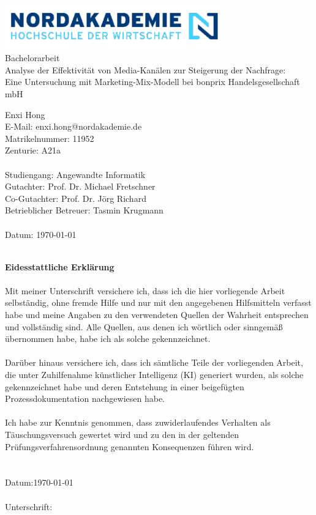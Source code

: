 \documentclass{common/nak}
\numberwithin{equation}{subsection}
\begin{document}
\hspace{3cm}
\begin{center}
    \includegraphics[width=0.7\textwidth]{images/nak_logo2.png}\\
     \huge { Bachelorarbeit \\[1em]
     \large{Analyse der Effektivität von Media-Kanälen zur Steigerung der Nachfrage:
     \\ Eine Untersuchung mit Marketing-Mix-Modell bei bonprix Handelsgesellschaft mbH
}}
\end{center}

\vspace*{\fill}


\noindent 
Enxi Hong \\
E-Mail: enxi.hong@nordakademie.de\\
Matrikelnummer: 11952\\
Zenturie: A21a\\\\
Studiengang: Angewandte Informatik\\
Gutachter: Prof. Dr. Michael Fretschner\\
Co-Gutachter: Prof. Dr. Jörg Richard\\
Betrieblicher Betreuer: Tasmin Krugmann\\\\
Datum: \today

\newpage

\newpage
\hspace{2cm}\\
\textbf{\Large Eidesstattliche Erklärung}\\\\
Mit meiner Unterschrift versichere ich, dass ich die hier vorliegende Arbeit 
selbständig, ohne fremde Hilfe und nur mit den angegebenen Hilfsmitteln verfasst 
habe und meine Angaben zu den verwendeten Quellen der Wahrheit entsprechen und 
vollständig sind. Alle Quellen, aus denen ich wörtlich oder sinngemäß übernommen 
habe, habe ich als solche gekennzeichnet.\\\\
Darüber hinaus versichere ich, dass ich sämtliche Teile der vorliegenden Arbeit, die 
unter Zuhilfenahme künstlicher Intelligenz (KI) generiert wurden, als solche gekennzeichnet habe und deren Entstehung in einer beigefügten Prozessdokumentation 
nachgewiesen habe. \\\\
Ich habe zur Kenntnis genommen, dass zuwiderlaufendes Verhalten als Täuschungsversuch gewertet wird und zu den in der geltenden Prüfungsverfahrensordnung 
genannten Konsequenzen führen wird.\\\\
 \\
Datum:\hspace{1cm}\today\\\\
Unterschrift:
\end{document}

